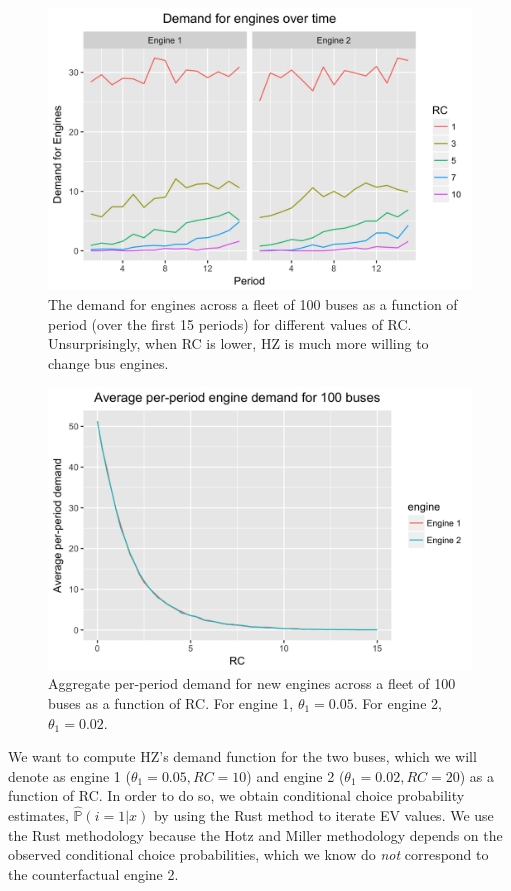 \documentclass[paper=a4, fontsize=11pt]{scrartcl} %
\numberwithin{equation}{section} %
\numberwithin{figure}{section} %
\numberwithin{table}{section} %
\begin{document}
\begin{itemize}
\begin{itemize}
\begin{figure}[ht!]
\centering
	\includegraphics[scale=.25]{per_period_demand_plot.png}
\caption{The demand for engines across a fleet of 100 buses as a function of period (over the first 15 periods) for different values of RC. Unsurprisingly, when RC is lower, HZ is much more willing to change bus engines.}
\label{fig:time_demand_rc}
\end{figure}

\begin{figure}[ht!]
\centering
	\includegraphics[scale=.25]{aggregate_demand_plot.png}
\caption{Aggregate per-period demand for new engines across a fleet of 100 buses as a function of RC. For engine 1, $\theta_1 = 0.05$. For engine 2, $\theta_1 = 0.02$.}
\label{fig:agg_demand_rc}
\end{figure}


We want to compute HZ's demand function for the two buses, which we will denote as engine 1 ($\theta_1 = 0.05, RC = 10$) and engine 2 ($\theta_1 = 0.02, RC = 20$) as a function of RC. In order to do so, we obtain conditional choice probability estimates, $\hat{\mathbb{P}}(i = 1 | x)$ by using the Rust \cite{rust1987optimal} method to iterate EV values. We use the Rust methodology because the Hotz and Miller \cite{hotz1993conditional} methodology depends on the observed conditional choice probabilities, which we know do \textit{not} correspond to the counterfactual engine 2.


\end{itemize}
\end{itemize}
\end{document}
